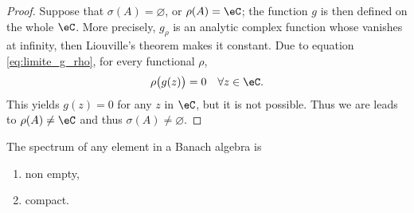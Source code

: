 \begin{proof}
	Suppose that $\sigma(A)=\varnothing$, or $\rho(A)=\eC$; the function $g$ is then defined on the whole $\eC$. More precisely, $g_{\rho}$ is an analytic complex function whose vanishes at infinity, then Liouville's theorem makes it constant. Due to equation \eqref{eq:limite_g_rho}, for every functional $\rho$,
	\[
	   \rho\big(g(z)\big)=0\quad\forall z\in\eC.
	\]
	This yields $g(z)=0$ for any $z$ in $\eC$, but it is not possible. Thus we are leads to $\rho(A)\neq\eC$ and thus $\sigma(A)\neq\varnothing$.
\end{proof}

\begin{theorem}
The spectrum of any element in a Banach algebra is 
\begin{enumerate}
\item non empty,
\item compact.
\end{enumerate}
\end{theorem}

